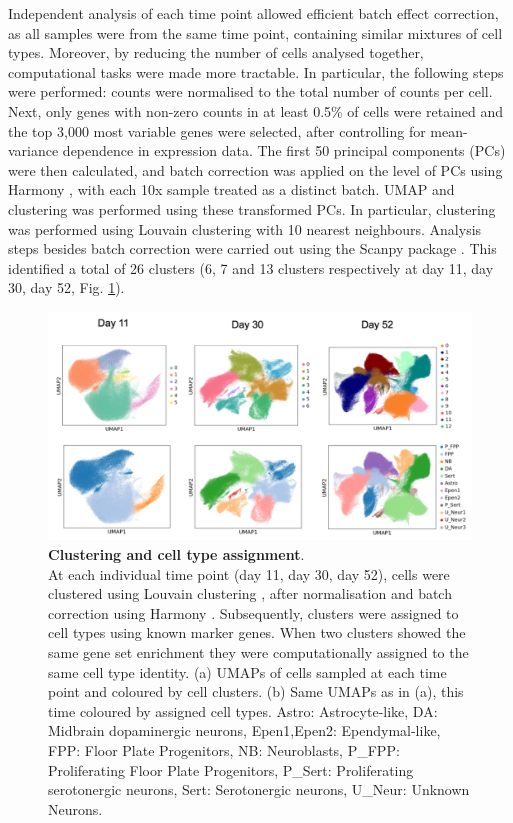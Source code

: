 Independent analysis of each time point allowed efficient batch effect correction, as all samples were from the same time point, containing similar mixtures of cell types.
Moreover, by reducing the number of cells analysed together, computational tasks were made more tractable.
In particular, the following steps were performed: counts were normalised to the total number of counts per cell. 
Next, only genes with non-zero counts in at least 0.5\% of cells were retained and the top 3,000 most variable genes were selected, after controlling for mean-variance dependence in expression data. 
The first 50 principal components (PCs) were then calculated, and
batch correction was applied on the level of PCs using Harmony \cite{korsunsky2019fast}, with each 10x sample treated as a distinct batch. 
UMAP and clustering was performed using these transformed PCs. 
In particular, clustering was performed using Louvain clustering \cite{blondel2008fast} with 10 nearest neighbours. 
Analysis steps besides batch correction were carried out using the Scanpy package \cite{wolf2018scanpy}. 
This identified a total of 26 clusters (6, 7 and 13 clusters respectively at day 11, day 30, day 52, Fig. \ref{fig:neuroseq_clusters}). \\

\begin{figure}[h]
\centering
\includegraphics[width=16cm]{Chapter5/Fig/neuroseq_clusters_celltypes.png}
\caption[Clustering and cell type assignment]{\textbf{Clustering and cell type assignment}.\\
At each individual time point (day 11, day 30, day 52), cells were clustered using Louvain clustering \cite{blondel2008fast}, after normalisation and batch correction using Harmony \cite{korsunsky2019fast}.
Subsequently, clusters were assigned to cell types using known marker genes. 
When two clusters showed the same gene set enrichment they were computationally assigned to the same cell type identity. 
(a) UMAPs of cells sampled at each time point and coloured by cell clusters. 
(b) Same UMAPs as in (a), this time coloured by assigned cell types.
Astro: Astrocyte-like, DA: Midbrain dopaminergic neurons, Epen1,Epen2: Ependymal-like, FPP: Floor Plate Progenitors, NB: Neuroblasts, P\_FPP: Proliferating Floor Plate Progenitors, P\_Sert: Proliferating serotonergic neurons, Sert: Serotonergic neurons, U\_Neur: Unknown Neurons.}
\label{fig:neuroseq_clusters}
\end{figure}

